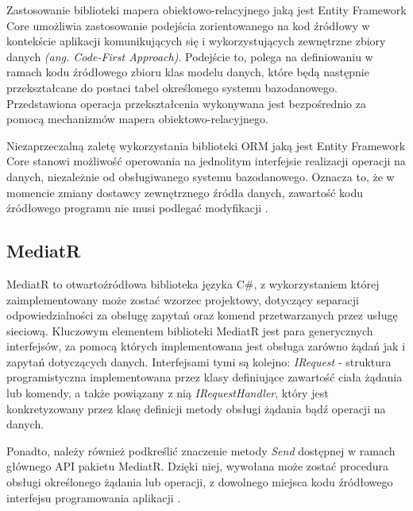 Zastosowanie biblioteki mapera obiektowo-relacyjnego jaką jest Entity Framework Core umożliwia zastosowanie podejścia zorientowanego na kod źródłowy w kontekście aplikacji komunikujących się i wykorzystujących zewnętrzne zbiory danych \textit{(ang. Code-First Approach)}. Podejście to, polega na definiowaniu w ramach kodu źródłowego zbioru klas modelu danych, które będą następnie przekształcane do postaci tabel określonego systemu bazodanowego. Przedstawiona operacja przekształcenia wykonywana jest bezpośrednio za pomocą mechanizmów mapera obiektowo-relacyjnego. 

Niezaprzeczalną zaletę wykorzystania biblioteki ORM jaką jest Entity Framework Core stanowi możliwość operowania na jednolitym interfejsie realizacji operacji na danych, niezależnie od obsługiwanego systemu bazodanowego. Oznacza to, że w momencie zmiany dostawcy zewnętrznego źródła danych, zawartość kodu źródłowego programu nie musi podlegać modyfikacji \cite{smith2021entity}.
\subsection*{MediatR}
MediatR to otwartoźródłowa biblioteka języka C\#, z wykorzystaniem której zaimplementowany może zostać wzorzec projektowy, dotyczący separacji odpowiedzialności za obsługę zapytań oraz komend przetwarzanych przez usługę sieciową. Kluczowym elementem biblioteki MediatR jest para generycznych interfejsów, za pomocą których implementowana jest obsługa zarówno żądań jak i zapytań dotyczących danych. Interfejsami tymi są kolejno: \textit{IRequest} - struktura programistyczna implementowana przez klasy definiujące zawartość ciała żądania lub komendy, a także powiązany z nią \textit{IRequestHandler}, który jest konkretyzowany przez klasę definicji metody obsługi żądania bądź operacji na danych. 

Ponadto, należy również podkreślić znaczenie metody \textit{Send} dostępnej w ramach głównego API pakietu MediatR. Dzięki niej, wywołana może zostać procedura obsługi określonego żądania lub operacji, z dowolnego miejsca kodu źródłowego interfejsu programowania aplikacji \cite{mediatr}.
